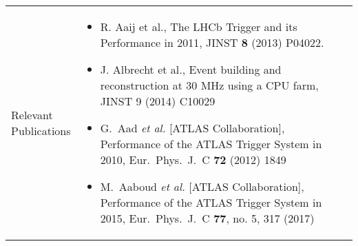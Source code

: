 \begin{center}
{\begin{tabular}{@{}p{25mm}|p{190mm}@{}}
{}\tabularnewline\hline
\pbox{8cm}{\Tstrut Relevant\\Publications} &%
{\vspace{-3mm}
\begin{itemize}%
\item R. Aaij et al., The LHCb Trigger and its Performance in 2011, JINST {\bf 8} (2013) P04022.
\item J. Albrecht et al., Event building and reconstruction at 30 MHz using a CPU farm, JINST 9 (2014) C10029
\item G.~Aad {\it et al.} [ATLAS Collaboration], Performance of the ATLAS Trigger System in 2010, Eur.\ Phys.\ J.\ C {\bf 72} (2012) 1849
\item M.~Aaboud {\it et al.} [ATLAS Collaboration], Performance of the ATLAS Trigger System in 2015, Eur.\ Phys.\ J.\ C {\bf 77}, no. 5, 317 (2017)
\vspace{-4mm}
\end{itemize}
}\tabularnewline\hline
\end{tabular}
}%
\end{center}